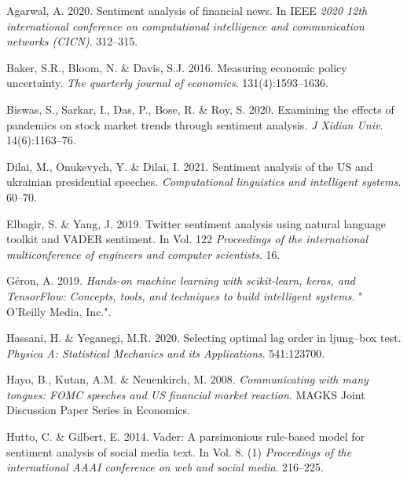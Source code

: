 \documentclass[11pt,preprint, authoryear]{elsarticle}
\numberwithin{equation}{section}
\numberwithin{figure}{section}
\numberwithin{table}{section}
\newlength{\cslhangindent}
\newenvironment{CSLReferences}%
  {\setlength{\parindent}{0pt}%
  \everypar{\setlength{\hangindent}{\cslhangindent}}\ignorespaces}%
  {\par}
\begin{document}
\hypertarget{refs}{}
\begin{CSLReferences}{1}{0}
\leavevmode{}%
Agarwal, A. 2020. Sentiment analysis of financial news. In IEEE
\emph{2020 12th international conference on computational intelligence
and communication networks (CICN)}. 312--315.

\leavevmode{}%
Baker, S.R., Bloom, N. \& Davis, S.J. 2016. Measuring economic policy
uncertainty. \emph{The quarterly journal of economics}.
131(4):1593--1636.

\leavevmode{}%
Biswas, S., Sarkar, I., Das, P., Bose, R. \& Roy, S. 2020. Examining the
effects of pandemics on stock market trends through sentiment analysis.
\emph{J Xidian Univ}. 14(6):1163--76.

\leavevmode{}%
Dilai, M., Onukevych, Y. \& Dilai, I. 2021. Sentiment analysis of the US
and ukrainian presidential speeches. \emph{Computational linguistics and
intelligent systems}. 60--70.

\leavevmode{}%
Elbagir, S. \& Yang, J. 2019. Twitter sentiment analysis using natural
language toolkit and VADER sentiment. In Vol. 122 \emph{Proceedings of
the international multiconference of engineers and computer scientists}.
16.

\leavevmode{}%
Géron, A. 2019. \emph{Hands-on machine learning with scikit-learn,
keras, and TensorFlow: Concepts, tools, and techniques to build
intelligent systems}. " O'Reilly Media, Inc.".

\leavevmode{}%
Hassani, H. \& Yeganegi, M.R. 2020. Selecting optimal lag order in
ljung--box test. \emph{Physica A: Statistical Mechanics and its
Applications}. 541:123700.

\leavevmode{}%
Hayo, B., Kutan, A.M. \& Neuenkirch, M. 2008. \emph{Communicating with
many tongues: FOMC speeches and US financial market reaction}. MAGKS
Joint Discussion Paper Series in Economics.

\leavevmode{}%
Hutto, C. \& Gilbert, E. 2014. Vader: A parsimonious rule-based model
for sentiment analysis of social media text. In Vol. 8. (1)
\emph{Proceedings of the international AAAI conference on web and social
media}. 216--225.


\end{CSLReferences}
\end{document}
